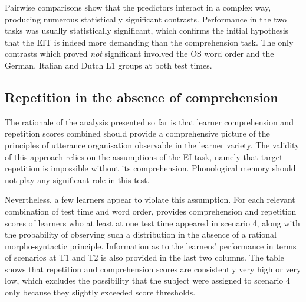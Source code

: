 Pairwise comparisons show that the predictors interact in a complex way, producing numerous statistically significant contrasts. Performance in the two tasks was usually statistically significant, which confirms the initial hypothesis that the EIT is indeed more demanding than the comprehension task. The only contrasts which proved \textit{not} significant involved the OS word order and the German, Italian and Dutch L1 groups at both test times.

\subsection{Repetition in the absence of comprehension}\label{sec:06:4.1}

The rationale of the analysis presented so far is that learner comprehension and repetition scores combined should provide a comprehensive picture of the principles of utterance organisation observable in the learner variety. The validity of this approach relies on the assumptions of the EI task, namely that target repetition is impossible without its comprehension. Phonological memory should not play any significant role in this test. 

Nevertheless, a few learners appear to violate this assumption. For each relevant combination of test time and word order,  provides comprehension and repetition scores of learners who at least at one test time appeared in scenario 4, along with the probability of observing such a distribution in the absence of a rational morpho-syntactic principle. Information as to the learners' performance in terms of scenarios at T1 and T2 is also provided in the last two columns. The table shows that repetition and comprehension scores are consistently very high or very low, which excludes the possibility that the subject were assigned to scenario 4 only because they slightly exceeded score thresholds. 

